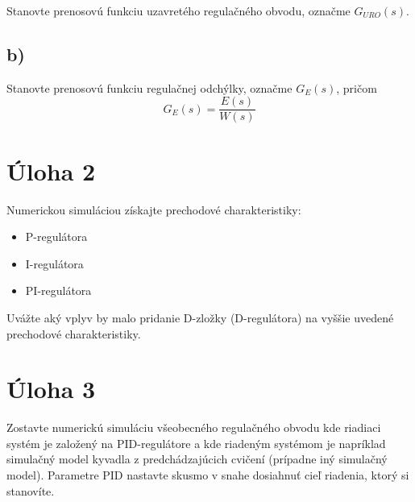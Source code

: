 \documentclass[a4paper, 10pt, ]{article}
\begin{document}
Stanovte prenosovú funkciu uzavretého regulačného obvodu, označme $G_{URO}(s)$.

\subsection*{b)}

Stanovte prenosovú funkciu regulačnej odchýlky, označme $G_{E}(s)$, pričom
\begin{equation}
    G_{E}(s)  = \frac{E(s)}{W(s)}
\end{equation}







\section*{Úloha 2}

Numerickou simuláciou získajte prechodové charakteristiky:

\begin{itemize}
    \item P-regulátora
    \item I-regulátora
    \item PI-regulátora
\end{itemize}

\noindent
Uvážte aký vplyv by malo pridanie D-zložky (D-regulátora) na vyššie uvedené prechodové charakteristiky.






\section*{Úloha 3}

Zostavte numerickú simuláciu všeobecného regulačného obvodu kde riadiaci systém je založený na PID-regulátore a kde riadeným systémom je napríklad simulačný model kyvadla z predchádzajúcich cvičení (prípadne iný simulačný model). Parametre PID nastavte skusmo v snahe dosiahnuť cieľ riadenia, ktorý si stanovíte.
\end{document}
